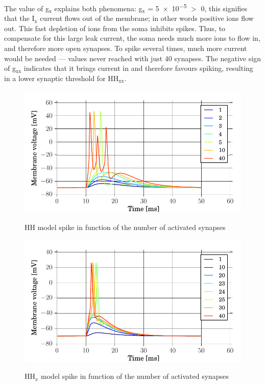 \documentclass[a4paper, 10pt, conference]{ieeeconf}      %
\begin{document}
The value of g$_\text{x}$ explains both phenomena: g$_\text{x}$ = \num{5e-5} $>$ 0, this signifies that the I$_\text{x}$ current flows out of the membrane; in other words positive ions flow out. This fast depletion of ions from the soma inhibits spikes. Thus, to compensate for this large leak current, the soma needs much more ions to flow in, and therefore more open synapses. To spike several times, much more current would be needed --- values never reached with just 40 synapses. The negative sign of g$_\text{xx}$ indicates that it brings current in and therefore favours spiking, resulting in a lower synaptic threshold for HH$_\text{xx}$. \\

\begin{figure}
\includegraphics[width=\columnwidth]{../figures/1_3-HH_synapse_number.pdf}
\label{fig:1_3a}
\caption{HH model spike in function of the number of activated synapses}
\end{figure}

\begin{figure}
\includegraphics[width=\columnwidth]{../figures/1_3-HHx_synapse_number.pdf}
\label{fig:1_3b}
\caption{HH$_x$ model spike in function of the number of activated synapses}
\end{figure}
\end{document}
